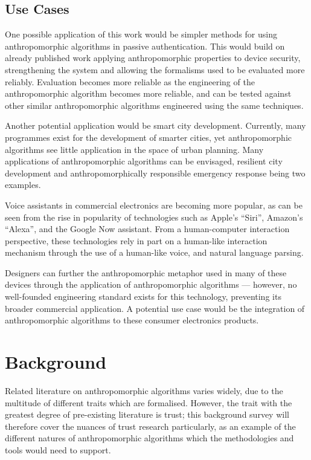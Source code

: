 \subsection{Use Cases}
One possible application of this work would be simpler methods for using anthropomorphic algorithms in passive authentication. This would build on already published work applying anthropomorphic properties to device security\cite{Crawford2013127}, strengthening the system and allowing the formalisms used to be evaluated more reliably. Evaluation becomes more reliable as the engineering of the anthropomorphic algorithm becomes more reliable, and can be tested against other similar anthropomorphic algorithms engineered using the same techniques.\par

Another potential application would be smart city development. Currently, many programmes exist for the development of smarter cities\cite{nam2011conceptualizing}, yet anthropomorphic algorithms see little application in the space of urban planning. Many applications of anthropomorphic algorithms can be envisaged\cite{wallis_x}, resilient city development and anthropomorphically responsible emergency response being two examples.\par

Voice assistants in commercial electronics are becoming more popular, as can be seen from the rise in popularity of technologies such as Apple's ``Siri'', Amazon's ``Alexa'', and the Google Now assistant. From a human-computer interaction perspective, these technologies rely in part on a human-like interaction mechanism through the use of a human-like voice, and natural language parsing.\par

Designers can further the anthropomorphic metaphor used in many of these devices through the application of anthropomorphic algorithms --- however, no well-founded engineering standard exists for this technology, preventing its broader commercial application. A potential use case would be the integration of anthropomorphic algorithms to these consumer electronics products.\par

\section{Background}
\label{sec:background}
Related literature on anthropomorphic algorithms varies widely, due to the multitude of different traits which are formalised. However, the trait with the greatest degree of pre-existing literature is trust; this background survey will therefore cover the nuances of trust research particularly, as an example of the different natures of anthropomorphic algorithms which the methodologies and tools would need to support.\par

